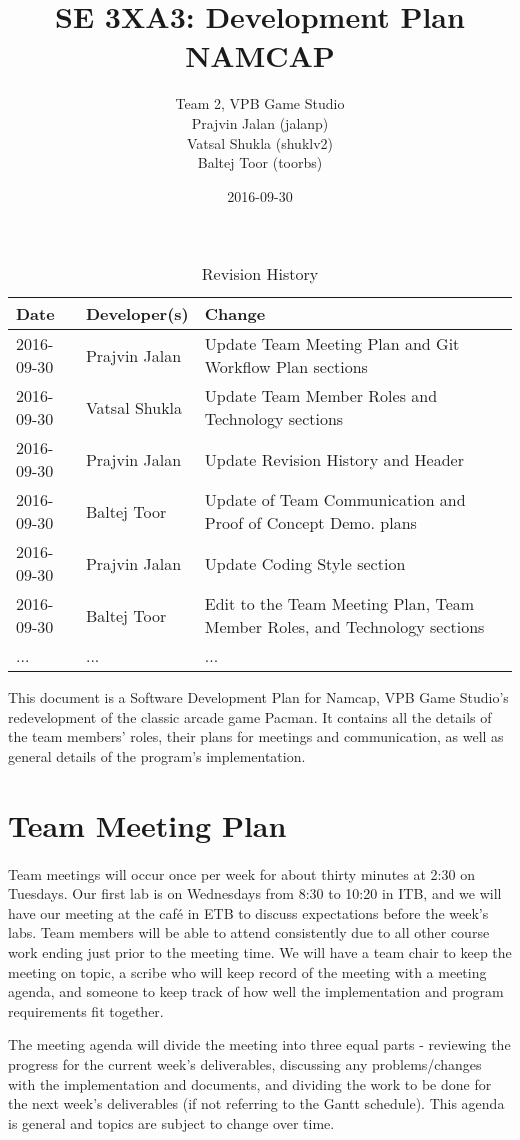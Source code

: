 \documentclass{article}
\title{SE 3XA3: Development Plan\\NAMCAP}
\author{Team 2, VPB Game Studio
		\\ Prajvin Jalan (jalanp)
		\\ Vatsal Shukla (shuklv2)
		\\ Baltej Toor (toorbs)
}
\date{2016-09-30}
\begin{document}
\begin{table}[hp]
\caption{Revision History} \label{TblRevisionHistory}
\begin{tabularx}{\textwidth}{llX}
\toprule
\textbf{Date} & \textbf{Developer(s)} & \textbf{Change}\\
\midrule
2016-09-30 & Prajvin Jalan & Update Team Meeting Plan and Git Workflow Plan sections\\
2016-09-30 & Vatsal Shukla & Update Team Member Roles and Technology sections \\
2016-09-30 & Prajvin Jalan & Update Revision History and Header\\
2016-09-30 & Baltej Toor & Update of Team Communication and Proof of Concept Demo. plans\\
2016-09-30 & Prajvin Jalan & Update Coding Style section\\
2016-09-30 & Baltej Toor & Edit to the Team Meeting Plan, Team Member Roles, and Technology sections\\ 
... & ... & ...\\
\bottomrule
\end{tabularx}
\end{table}

\newpage

\maketitle

This document is a Software Development Plan for Namcap, VPB Game Studio's redevelopment of the classic arcade game Pacman. It contains all the details of the team members' roles, their plans for meetings and communication, as well as general details of the program's implementation.

\section{Team Meeting Plan}

\paragraph{}
Team meetings will occur once per week for about thirty minutes at 2:30 on Tuesdays. Our first lab is on Wednesdays from 8:30 to 10:20 in ITB, and we will have our meeting at the café in ETB to discuss expectations before the week's labs. Team members will be able to attend consistently due to all other course work ending just prior to the meeting time. We will have a team chair to keep the meeting on topic, a scribe who will keep record of the meeting with a meeting agenda, and someone to keep track of how well the implementation and program requirements fit together.\par The meeting agenda will divide the meeting into three equal parts - reviewing the progress for the current week's deliverables, discussing any problems/changes with the implementation and documents, and dividing the work to be done for the next week's deliverables (if not referring to the Gantt schedule). This agenda is general and topics are subject to change over time.
\end{document}

